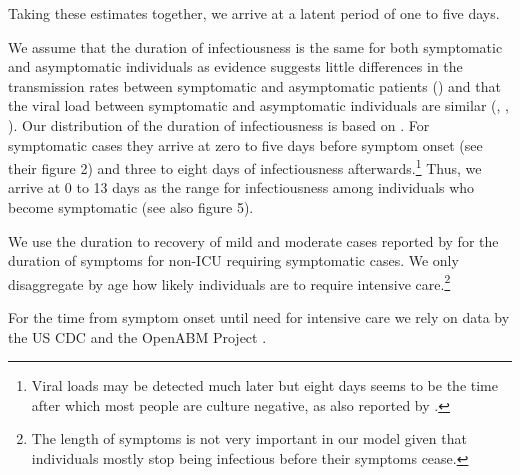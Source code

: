 Taking these estimates together, we arrive at a latent period of one to five days.


We assume that the duration of infectiousness is the same for both symptomatic and
asymptomatic individuals as evidence suggests little differences in the transmission
rates between symptomatic and asymptomatic patients (\citet{Yin2020}) and that the viral
load between symptomatic and asymptomatic individuals are similar (\citet{Zou2020},
\citet{Byrne2020}, \citet{Singanayagam2020}). Our distribution of the duration of
infectiousness is based on \citet{Byrne2020}. For symptomatic cases they arrive at zero
to five days before symptom onset (see their figure 2) and three to eight days of
infectiousness afterwards.\footnote{Viral loads may be detected much later but eight days
seems to be the time after which most people are culture negative, as also reported by
\citet{Singanayagam2020}.} Thus, we arrive at 0 to 13 days as the range for
infectiousness among individuals who become symptomatic (see also figure 5).


We use the duration to recovery of mild and moderate cases reported by \cite[Figure~S3,
Panel~2]{Bi2020} for the duration of symptoms for non-ICU requiring symptomatic cases. We
only disaggregate by age how likely individuals are to require intensive
care.\footnote{The length of symptoms is not very important in our model given that
individuals mostly stop being infectious before their symptoms cease.}


For the time from symptom onset until need for intensive care we rely on data by the US
CDC \citep{Stokes2020} and the OpenABM Project \citep{Hinch2021}.

